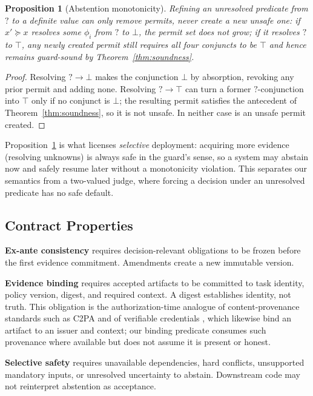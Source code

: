 \documentclass[sigconf,anonymous,review]{acmart}
\newtheorem{proposition}{Proposition}
\begin{document}
\begin{proposition}[Abstention monotonicity]
\label{prop:abstain}
Refining an unresolved predicate from $?$ to a definite value can only remove permits, never create a new unsafe one: if $x'\!\succeq x$ resolves some $\phi_i$ from $?$ to $\bot$, the permit set does not grow; if it resolves $?$ to $\top$, any newly created permit still requires all four conjuncts to be $\top$ and hence remains guard-sound by Theorem~\ref{thm:soundness}.
\end{proposition}
\begin{proof}
Resolving $?\to\bot$ makes the conjunction $\bot$ by absorption, revoking any prior permit and adding none. Resolving $?\to\top$ can turn a former $?$-conjunction into $\top$ only if no conjunct is $\bot$; the resulting permit satisfies the antecedent of Theorem~\ref{thm:soundness}, so it is not unsafe. In neither case is an unsafe permit created.
\end{proof}

Proposition~\ref{prop:abstain} is what licenses \emph{selective} deployment: acquiring more evidence (resolving unknowns) is always safe in the guard's sense, so a system may abstain now and safely resume later without a monotonicity violation. This separates our semantics from a two-valued judge, where forcing a decision under an unresolved predicate has no safe default.

\subsection{Contract Properties}
\textbf{Ex-ante consistency} requires decision-relevant obligations to be frozen before the first evidence commitment. Amendments create a new immutable version.

\textbf{Evidence binding} requires accepted artifacts to be committed to task identity, policy version, digest, and required context. A digest establishes identity, not truth. This obligation is the authorization-time analogue of content-provenance standards such as C2PA \cite{c2pa2023spec} and of verifiable credentials \cite{sporny2022vc}, which likewise bind an artifact to an issuer and context; our binding predicate consumes such provenance where available but does not assume it is present or honest.

\textbf{Selective safety} requires unavailable dependencies, hard conflicts, unsupported mandatory inputs, or unresolved uncertainty to abstain. Downstream code may not reinterpret abstention as acceptance.
\end{document}
